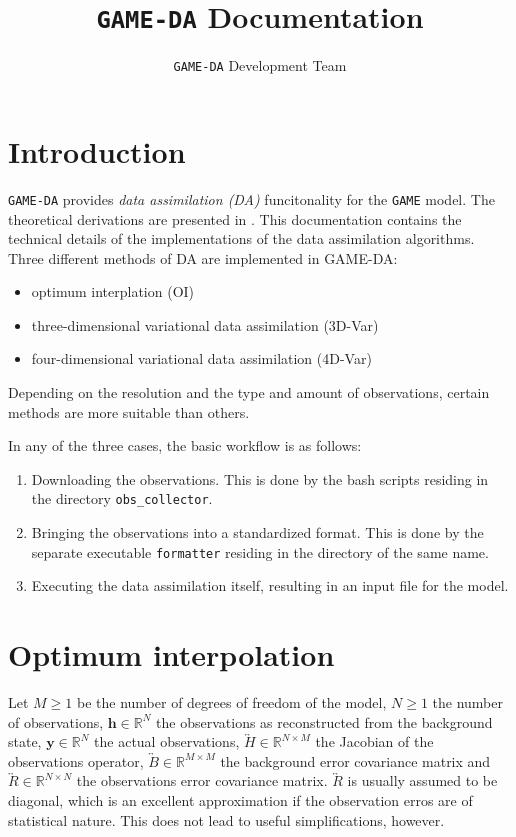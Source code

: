 \documentclass{report}
\title{\texttt{GAME-DA} Documentation}
\author{\texttt{GAME-DA} Development Team}
\date{}
\begin{document}
\maketitle

\tableofcontents

\chapter{Introduction}
\label{sec:introduction}

\texttt{GAME-DA} provides \textit{data assimilation (DA)} funcitonality for the \texttt{GAME} model. The theoretical derivations are presented in \cite{kompendium}. This documentation contains the technical details of the implementations of the data assimilation algorithms. Three different methods of DA are implemented in GAME-DA:
%
\begin{itemize}
\item optimum interplation (OI)
\item three-dimensional variational data assimilation (3D-Var)
\item four-dimensional variational data assimilation (4D-Var)
\end{itemize}
%
Depending on the resolution and the type and amount of observations, certain methods are more suitable than others.

In any of the three cases, the basic workflow is as follows:
%
\begin{enumerate}
\item Downloading the observations. This is done by the bash scripts residing in the directory \texttt{obs\_collector}.
\item Bringing the observations into a standardized format. This is done by the separate executable \texttt{formatter} residing in the directory of the same name.
\item Executing the data assimilation itself, resulting in an input file for the model.
\end{enumerate}

\chapter{Optimum interpolation}
\label{chap:optimum_interpolation}

Let $M \geq 1$ be the number of degrees of freedom of the model, $N \geq 1$ the number of observations, $\mathbf{h} \in \mathbb{R}^N$ the observations as reconstructed from the background state, $\mathbf{y} \in \mathbb{R}^N$ the actual observations, $\overleftrightarrow{H} \in \mathbb{R}^{N\times M}$ the Jacobian of the observations operator, $\overleftrightarrow{B} \in \mathbb{R}^{M\times M}$ the background error covariance matrix and $\overleftrightarrow{R} \in \mathbb{R}^{N\times N}$ the observations error covariance matrix. $\overleftrightarrow{R}$ is usually assumed to be diagonal, which is an excellent approximation if the observation erros are of statistical nature. This does not lead to useful simplifications, however.
\end{document}
